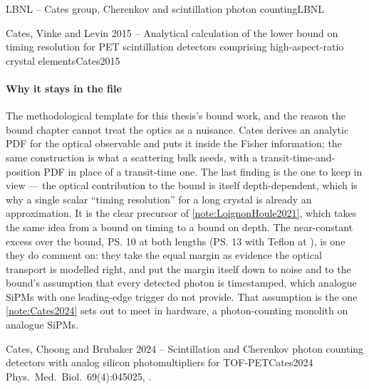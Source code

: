 \begin{programnote}{LBNL -- Cates group, Cherenkov and scintillation photon counting}{LBNL}
\begin{papernote}{Cates, Vinke and Levin 2015 -- Analytical calculation of the lower bound on timing resolution for PET scintillation detectors comprising high-aspect-ratio crystal elements}{Cates2015}
\paragraph{Why it stays in the file}
The methodological template for this thesis's bound work, and the reason the
bound chapter cannot treat the optics as a nuisance. Cates derives an analytic
PDF for the optical observable and puts it inside the Fisher information; the
same construction is what a scattering bulk needs, with a
transit-time-and-position PDF in place of a transit-time one. The last finding is the one to
keep in view --- the optical contribution to the bound is itself depth-dependent,
which is why a single scalar ``timing resolution'' for a long crystal is
already an approximation.
It is the clear precursor of \ref{note:LoignonHoule2021}, which takes the same idea
from a bound on timing to a bound on depth.
The near-constant excess over the bound, \ps{10} at both lengths (\ps{13}
with Teflon at ), is one they do comment on: they take the equal
margin as evidence the optical transport is modelled right, and put the
margin itself down to noise and to the bound's assumption that every
detected photon is timestamped, which analogue SiPMs with one leading-edge
trigger do not provide. That assumption is the one \ref{note:Cates2024}
sets out to meet in hardware, a photon-counting monolith on analogue SiPMs.

\end{papernote}

\begin{papernote}{Cates, Choong and Brubaker 2024 -- Scintillation and Cherenkov photon counting detectors with analog silicon photomultipliers for TOF-PET}{Cates2024}
Phys.\ Med.\ Biol.\ 69(4):045025, .


\end{papernote}
\end{programnote}
